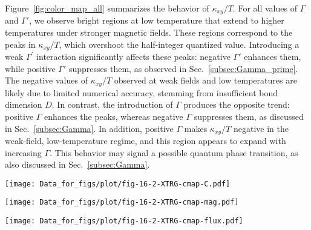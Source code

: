 \documentclass[twocolumn,superscriptaddress,showpacs, longbibliography, aps, prx]{revtex4-2}
\begin{document}
Figure~\ref{fig:color_map_all} summarizes the behavior of $\kappa_{xy}/T$. 
For all values of $\Gamma$ and $\Gamma'$, we observe bright regions at low temperature that extend to higher temperatures under stronger magnetic fields. 
These regions correspond to the peaks in $\kappa_{xy}/T$, which overshoot the half-integer quantized value. 
Introducing a weak $\Gamma^{\prime}$ interaction significantly affects these peaks: 
negative $\Gamma'$ enhances them, while positive $\Gamma'$ suppresses them, as observed in Sec.~\ref{subsec:Gamma_prime}. 
The negative values of $\kappa_{xy}/T$ observed at weak fields and low temperatures are likely due to limited numerical accuracy, stemming from insufficient bond dimension $D$. 
In contrast, the introduction of $\Gamma$ produces the opposite trend:
positive $\Gamma$ enhances the peaks, whereas negative $\Gamma$ suppresses them, as discussed in Sec.~\ref{subsec:Gamma}.
In addition, positive $\Gamma$ makes $\kappa_{xy}/T$ negative in the weak-field, low-temperature regime, and this region appears to expand with increasing $\Gamma$. 
This behavior may signal a possible quantum phase transition, as also discussed in Sec.~\ref{subsec:Gamma}. 

\begin{figure*}[htb]
  \begin{center}
    \texttt{[image: Data\_for\_figs/plot/fig-16-2-XTRG-cmap-C.pdf]}
  \end{center}
  \caption{
Color maps of the specific heat for the pure Kitaev model on the field-temperature plane with (a)-(e) $\Gamma=0$ and varying $\Gamma'$ and  (f)-(i) varying $\Gamma$ and $\Gamma'=0$.}
  \label{fig:color_map_C}
\end{figure*}

\begin{figure*}[htb]
  \begin{center}
    \texttt{[image: Data\_for\_figs/plot/fig-16-2-XTRG-cmap-mag.pdf]}
  \end{center}
  \caption{
Color maps of the magnetization, corresponding to Fig.~\ref{fig:color_map_C}.} 
  \label{fig:color_map_mag}
\end{figure*}

\begin{figure*}[htb]
  \begin{center}
    \texttt{[image: Data\_for\_figs/plot/fig-16-2-XTRG-cmap-flux.pdf]}
  \end{center}
  \caption{
Color maps of the flux density, corresponding to Fig.~\ref{fig:color_map_C}.} 
  \label{fig:color_map_flux}
\end{figure*}
\end{document}
